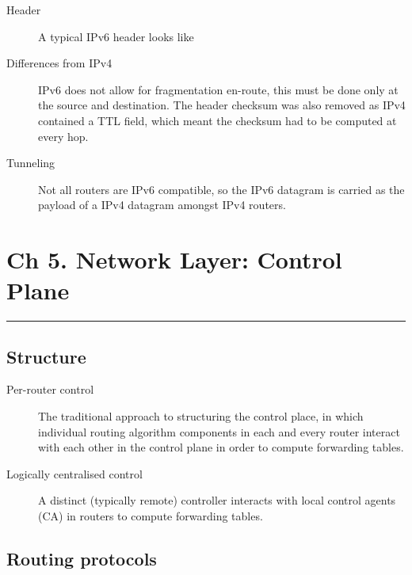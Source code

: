 \documentclass{article}
\begin{document}
\begin{description}
    \item[Header] A typical IPv6 header looks like
    
    \item[Differences from IPv4] IPv6 does not allow for fragmentation en-route, this must be done
    only at the source and destination. The header checksum was also removed as IPv4 contained a TTL
    field, which meant the checksum had to be computed at every hop. 
    
    \item[Tunneling] Not all routers are IPv6 compatible, so the IPv6 datagram is carried as the
    payload of a IPv4 datagram amongst IPv4 routers. 
\end{description}

\section*{Ch 5. Network Layer: Control Plane}
\noindent
\rule{\linewidth}{0.5mm}
\noindent

\subsection*{Structure}

\begin{description}
    \item[Per-router control] The traditional approach to structuring the control place, in which 
    individual routing algorithm components in each and every router interact with each other in the
    control plane in order to compute forwarding tables.
    
    \item[Logically centralised control] A distinct (typically remote) controller interacts with local
    control agents (CA) in routers to compute forwarding tables. 
\end{description}

\subsection*{Routing protocols}
\end{document}

